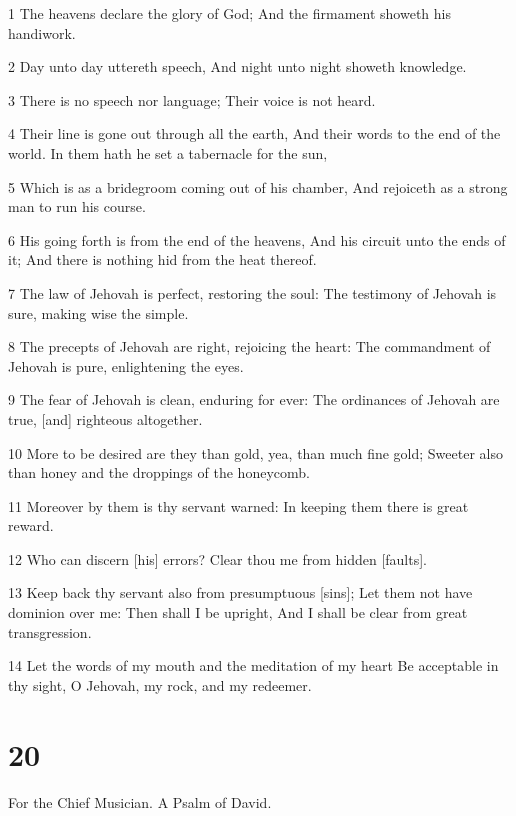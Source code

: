\par 1 The heavens declare the glory of God; And the firmament showeth his handiwork.
\par 2 Day unto day uttereth speech, And night unto night showeth knowledge.
\par 3 There is no speech nor language; Their voice is not heard.
\par 4 Their line is gone out through all the earth, And their words to the end of the world. In them hath he set a tabernacle for the sun,
\par 5 Which is as a bridegroom coming out of his chamber, And rejoiceth as a strong man to run his course.
\par 6 His going forth is from the end of the heavens, And his circuit unto the ends of it; And there is nothing hid from the heat thereof.
\par 7 The law of Jehovah is perfect, restoring the soul: The testimony of Jehovah is sure, making wise the simple.
\par 8 The precepts of Jehovah are right, rejoicing the heart: The commandment of Jehovah is pure, enlightening the eyes.
\par 9 The fear of Jehovah is clean, enduring for ever: The ordinances of Jehovah are true, [and] righteous altogether.
\par 10 More to be desired are they than gold, yea, than much fine gold; Sweeter also than honey and the droppings of the honeycomb.
\par 11 Moreover by them is thy servant warned: In keeping them there is great reward.
\par 12 Who can discern [his] errors? Clear thou me from hidden [faults].
\par 13 Keep back thy servant also from presumptuous [sins]; Let them not have dominion over me: Then shall I be upright, And I shall be clear from great transgression.
\par 14 Let the words of my mouth and the meditation of my heart Be acceptable in thy sight, O Jehovah, my rock, and my redeemer.

\chapter{20}

\par For the Chief Musician. A Psalm of David.

